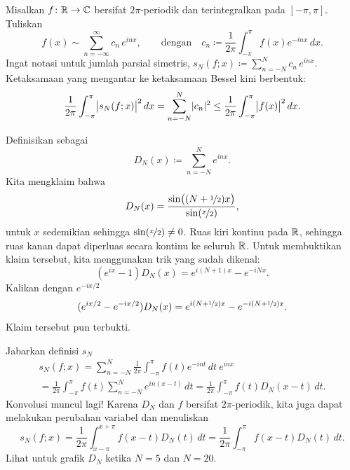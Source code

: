 Misalkan $f \colon {\mathbb{R}} \to {\mathbb{C}}$ bersifat $2\pi$-periodik dan terintegralkan
pada $[-\pi,\pi]$.
Tuliskan
\begin{equation*}
f(x) \sim
\sum_{n=-\infty}^\infty c_n \,e^{inx} ,
\qquad \text{dengan} \quad
c_n \coloneqq 
\frac{1}{2\pi} \int_{-\pi}^\pi
f(x) e^{-inx} \, dx .
\end{equation*}
Ingat notasi untuk jumlah parsial simetris,
$s_N(f;x) \coloneqq 
\sum_{n=-N}^N c_n \,e^{inx}$.
Ketaksamaan yang mengantar ke ketaksamaan Bessel kini berbentuk:
\begin{equation*}
\frac{1}{2\pi} \int_{-\pi}^\pi
\bigl\lvert {s_N(f;x)} \bigr\rvert^2 \, dx =
\sum_{n=-N}^N \lvert {c_n} \rvert^2
\leq
\frac{1}{2\pi} \int_{-\pi}^\pi
\bigl\lvert {f(x)} \bigr\rvert^2
\, dx .
\end{equation*}

Definisikan \emph{} sebagai
\begin{equation*}
D_N(x) \coloneqq \sum_{n=-N}^N e^{inx} .
\end{equation*}
Kita mengklaim bahwa
\begin{equation*}
D_N(x) =
\frac{\sin\bigl( (N+\nicefrac{1}{2})x \bigr)}{\sin(\nicefrac{x}{2})} ,
\end{equation*}
untuk $x$ sedemikian sehingga $\sin(\nicefrac{x}{2}) \neq 0$. Ruas kiri
kontinu pada ${\mathbb{R}}$, sehingga ruas kanan dapat diperluas secara kontinu ke
seluruh ${\mathbb{R}}$.
Untuk membuktikan klaim tersebut,
kita menggunakan trik yang sudah dikenal:
\begin{equation*}
(e^{ix}-1) D_N(x) = e^{i(N+1)x} - e^{-iNx} .
\end{equation*}
Kalikan dengan $e^{-ix/2}$
\begin{equation*}
(e^{ix/2}-e^{-ix/2}) D_N(x) = e^{i(N+\nicefrac{1}{2})x} -
e^{-i(N+\nicefrac{1}{2})x} .
\avoidbreak
\end{equation*}
Klaim tersebut pun terbukti.

Jabarkan definisi $s_N$
\begin{multline*}
s_N(f;x) = 
\sum_{n=-N}^N \frac{1}{2\pi} \int_{-\pi}^\pi f(t) e^{-int}  \,  dt ~ e^{inx}
\\
=
\frac{1}{2\pi} \int_{-\pi}^\pi f(t) \sum_{n=-N}^N e^{in(x-t)} \, dt
=
\frac{1}{2\pi} \int_{-\pi}^\pi f(t) D_N(x-t) \, dt .
\end{multline*}
Konvolusi muncul lagi!
Karena $D_N$ dan $f$ bersifat $2\pi$-periodik, kita juga dapat melakukan perubahan variabel dan menuliskan
\begin{equation*}
s_N(f;x) = 
\frac{1}{2\pi} \int_{x-\pi}^{x+\pi} f(x-t) D_N(t) \, dt
=
\frac{1}{2\pi} \int_{-\pi}^\pi f(x-t) D_N(t) \, dt .
\end{equation*}
Lihat  untuk grafik $D_N$ ketika $N=5$ dan $N=20$.

